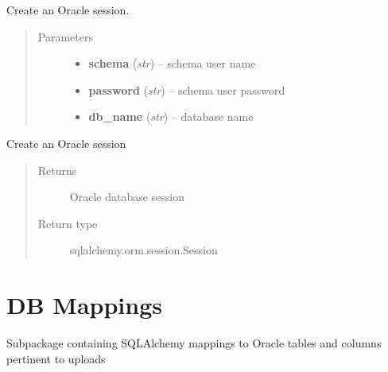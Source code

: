 \documentclass[letterpaper,10pt,english]{sphinxmanual}
\begin{document}
\begin{fulllineitems}
\label{modules:webb_utils.db_utils.AlchemDB}
Create an Oracle session.
\begin{quote}\begin{description}
\item[{Parameters}] \leavevmode\begin{itemize}
\item {} 
\textbf{schema} (\emph{str}) -- schema user name

\item {} 
\textbf{password} (\emph{str}) -- schema user password

\item {} 
\textbf{db\_name} (\emph{str}) -- database name

\end{itemize}

\end{description}\end{quote}

\begin{fulllineitems}
\label{modules:webb_utils.db_utils.AlchemDB.create_session}
Create an Oracle session
\begin{quote}\begin{description}
\item[{Returns}] \leavevmode
Oracle database session

\item[{Return type}] \leavevmode
sqlalchemy.orm.session.Session

\end{description}\end{quote}

\end{fulllineitems}


\end{fulllineitems}



\section{DB Mappings}
\label{modules:db-mappings}
Subpackage containing SQLAlchemy mappings to Oracle tables
and columns pertinent to uploads
\end{document}
